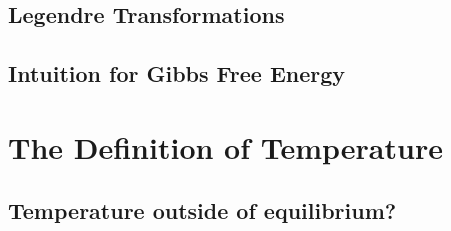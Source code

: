 \documentclass[11pt]{article}
\begin{document}
\subsection{Legendre Transformations}


\subsection{Intuition for Gibbs Free Energy}

\cite{Bryan18}

\newpage
\section{The Definition of Temperature}


\subsection{Temperature outside of equilibrium?}

\cite{PhysStackVeronika2017}



\newpage
\vskip 0.5cm
\end{document}
